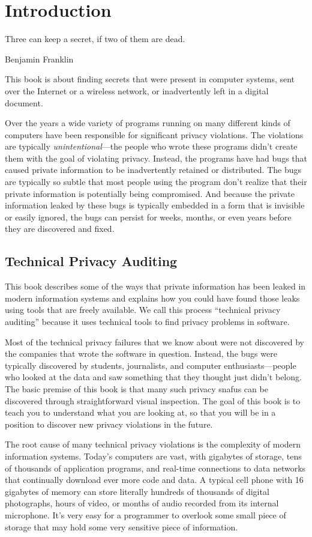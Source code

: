 \chapter{Introduction}
\epigraph{Three can keep a secret, if two of them are dead.}{Benjamin
  Franklin}

This book is about finding secrets that were present in computer
systems, sent over the Internet or a wireless network, or
inadvertently left in a digital document. 

Over the years a wide variety of programs running on many different
kinds of computers have been responsible for significant privacy
violations. The violations are typically \emph{unintentional}---the
people who wrote these programs didn't create them with the goal of
violating privacy. Instead, the programs have had bugs that caused
private information to be inadvertently retained or distributed. The
bugs are typically so subtle that most people using the program don't
realize that their private information is potentially being
compromised. And because the private information leaked by these bugs
is typically embedded in a form that is invisible or easily ignored,
the bugs can persist for weeks, months, or even years before they are
discovered and fixed.

\section{Technical Privacy Auditing}

This book describes some of the ways that private information has been
leaked in modern information systems and explains how you could have
found those leaks using tools that are freely available. We call this
process ``technical privacy auditing'' because it uses technical
tools to find privacy problems in software.

Most of the technical privacy failures that we know about were not
discovered by the companies that wrote the software in
question. Instead, the bugs were typically discovered by students,
journalists, and computer enthusiasts---people who looked at the data
and saw something that they thought just didn't belong. 
The basic premise of this book is that many such privacy snafus can
be discovered through straightforward visual inspection. The goal of
this book is to teach you to understand what you are looking at, so
that you will be in a position to discover new privacy violations in
the future.

The root cause of many technical privacy violations is the complexity
of modern information systems. Today's computers are vast, with
gigabytes of storage, tens of thousands of application programs, and
real-time connections to data networks that continually download ever 
more code and data. A typical cell phone with 16 gigabytes of memory can
store literally hundreds of thousands of digital photographs, hours of
video, or months of audio recorded from its internal
microphone. It's very easy for a programmer to overlook some small
piece of storage that may hold some very sensitive piece of
information. 

